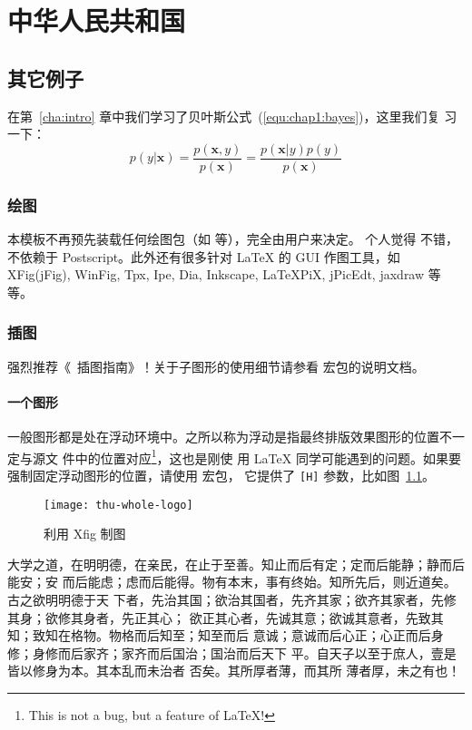 \chapter{中华人民共和国}
\label{cha:china}

\section{其它例子}
\label{sec:other}

在第~\ref{cha:intro} 章中我们学习了贝叶斯公式~(\ref{equ:chap1:bayes})，这里我们复
习一下：
\begin{equation}
\label{equ:chap2:bayes}
p(y|\mathbf{x}) = \frac{p(\mathbf{x},y)}{p(\mathbf{x})}=
\frac{p(\mathbf{x}|y)p(y)}{p(\mathbf{x})}
\end{equation}

\subsection{绘图}
\label{sec:draw}

本模板不再预先装载任何绘图包（如  等），完全由用户来决定。
个人觉得  不错，不依赖于 Postscript。此外还有很多针对 \LaTeX{} 的
 GUI 作图工具，如 XFig(jFig), WinFig, Tpx, Ipe, Dia, Inkscape, LaTeXPiX,
jPicEdt, jaxdraw 等等。

\subsection{插图}
\label{sec:graphs}

强烈推荐《\LaTeXe\ 插图指南》！关于子图形的使用细节请参看  宏包的说明文档。

\subsubsection{一个图形}
\label{sec:onefig}
一般图形都是处在浮动环境中。之所以称为浮动是指最终排版效果图形的位置不一定与源文
件中的位置对应\footnote{This is not a bug, but a feature of \LaTeX!}，这也是刚使
用 \LaTeX{} 同学可能遇到的问题。如果要强制固定浮动图形的位置，请使用  宏包，
它提供了 \texttt{[H]} 参数，比如图~\ref{fig:xfig1}。
\begin{figure}[H] %
  \centering
  \texttt{[image: thu-whole-logo]}
  \caption{利用 Xfig 制图}
  \label{fig:xfig1}
\end{figure}

大学之道，在明明德，在亲民，在止于至善。知止而后有定；定而后能静；静而后能安；安
而后能虑；虑而后能得。物有本末，事有终始。知所先后，则近道矣。古之欲明明德于天
下者，先治其国；欲治其国者，先齐其家；欲齐其家者，先修其身；欲修其身者，先正其心；
欲正其心者，先诚其意；欲诚其意者，先致其知；致知在格物。物格而后知至；知至而后
意诚；意诚而后心正；心正而后身 修；身修而后家齐；家齐而后国治；国治而后天下
平。自天子以至于庶人，壹是皆以修身为本。其本乱而未治者 否矣。其所厚者薄，而其所
薄者厚，未之有也！

